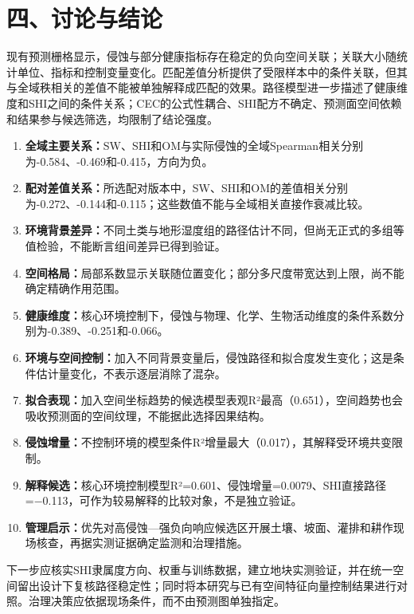 \documentclass[
  a4paper,
  12pt]{ctexart}
\providecommand{\tightlist}{%
  \setlength{\itemsep}{0pt}\setlength{\parskip}{0pt}}
\begin{document}
\hypertarget{ux56dbux8ba8ux8bbaux4e0eux7ed3ux8bba}{%
\section{四、讨论与结论}\label{ux56dbux8ba8ux8bbaux4e0eux7ed3ux8bba}}

现有预测栅格显示，侵蚀与部分健康指标存在稳定的负向空间关联；关联大小随统计单位、指标和控制变量变化。匹配差值分析提供了受限样本中的条件关联，但其与全域秩相关的差值不能被单独解释成匹配的效果。路径模型进一步描述了健康维度和SHI之间的条件关系；CEC的公式性耦合、SHI配方不确定、预测面空间依赖和结果参与候选筛选，均限制了结论强度。

\begin{enumerate}
\def\labelenumi{\arabic{enumi}.}
\tightlist
\item
  \textbf{全域主要关系：}SW、SHI和OM与实际侵蚀的全域Spearman相关分别为-0.584、-0.469和-0.415，方向为负。
\item
  \textbf{配对差值关系：}所选配对版本中，SW、SHI和OM的差值相关分别为-0.272、-0.144和-0.115；这些数值不能与全域相关直接作衰减比较。
\item
  \textbf{环境背景差异：}不同土类与地形湿度组的路径估计不同，但尚无正式的多组等值检验，不能断言组间差异已得到验证。
\item
  \textbf{空间格局：}局部系数显示关联随位置变化；部分多尺度带宽达到上限，尚不能确定精确作用范围。
\item
  \textbf{健康维度：}核心环境控制下，侵蚀与物理、化学、生物活动维度的条件系数分别为-0.389、-0.251和-0.066。
\item
  \textbf{环境与空间控制：}加入不同背景变量后，侵蚀路径和拟合度发生变化；这是条件估计量变化，不表示逐层消除了混杂。
\item
  \textbf{拟合表现：}加入空间坐标趋势的候选模型表观R²最高（0.651），空间趋势也会吸收预测面的空间纹理，不能据此选择因果结构。
\item
  \textbf{侵蚀增量：}不控制环境的模型条件R²增量最大（0.017），其解释受环境共变限制。
\item
  \textbf{解释候选：}核心环境控制模型R²=0.601、侵蚀增量=0.0079、SHI直接路径=−0.113，可作为较易解释的比较对象，不是独立验证。
\item
  \textbf{管理启示：}优先对高侵蚀---强负向响应候选区开展土壤、坡面、灌排和耕作现场核查，再据实测证据确定监测和治理措施。
\end{enumerate}

下一步应核实SHI隶属度方向、权重与训练数据，建立地块实测验证，并在统一空间留出设计下复核路径稳定性；同时将本研究与已有空间特征向量控制结果进行对照。治理决策应依据现场条件，而不由预测图单独指定。
\end{document}
